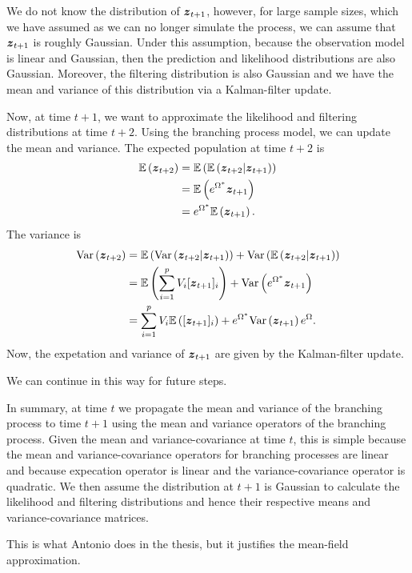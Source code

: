 \documentclass{article}
\begin{document}
We do not know the distribution of \(\boldsymbol{z}_{t+1}\), however, for large sample sizes, which we have assumed as we can no longer simulate the process, we can assume that \(\boldsymbol{z}_{t+1}\) is roughly Gaussian. Under this assumption, because the observation model is linear and Gaussian, then the prediction and likelihood distributions are also Gaussian. Moreover, the filtering distribution is also Gaussian and we have the mean and variance of this distribution via a Kalman-filter update.

Now, at time \(t+1\), we want to approximate the likelihood and filtering distributions at time \(t+2\). Using the branching process model, we can update the mean and variance. The expected population at time \(t+2\) is 
\begin{align}
    \mathbb{E}\left(\boldsymbol{z}_{t+2}\right) &= \mathbb{E}\left(\mathbb{E}\left(\boldsymbol{z}_{t+2}|\boldsymbol{z}_{t+1}\right)\right)
    \\&=\mathbb{E}\left(e^{\Omega^{*}}\boldsymbol{z}_{t+1}\right)
    \\&=e^{\Omega^{*}}\mathbb{E}\left(\boldsymbol{z}_{t+1}\right).
\end{align}
The variance is 
\begin{align}
    \mathrm{Var}\left(\boldsymbol{z}_{t+2}\right) &= \mathbb{E}\left(\mathrm{Var}\left(\boldsymbol{z}_{t+2}|\boldsymbol{z}_{t+1}\right)\right) + \mathrm{Var}\left(\mathbb{E}\left(\boldsymbol{z}_{t+2}|\boldsymbol{z}_{t+1}\right)\right)
    \\&=\mathbb{E}\left(\sum_{i=1}^pV_i[\boldsymbol{z}_{t+1}]_i\right) + \mathrm{Var}\left(e^{\Omega^{*}}\boldsymbol{z}_{t+1}\right)
    \\&=\sum_{i=1}^pV_i\mathbb{E}\left([\boldsymbol{z}_{t+1}]_i\right) + e^{\Omega^{*}}\mathrm{Var}\left(\boldsymbol{z}_{t+1}\right)e^{\Omega}.
\end{align}
Now, the expetation and variance of \(\boldsymbol{z}_{t+1}\) are given by the Kalman-filter update. 

We can continue in this way for future steps.

In summary, at time \(t\) we propagate the mean and variance of the branching process to time \(t+1\) using the mean and variance operators of the branching process. Given the mean and variance-covariance at time \(t\), this is simple because the mean and variance-covariance operators for branching processes are linear and because expecation operator is linear and the variance-covariance operator is quadratic. We then assume the distribution at \(t+1\) is Gaussian to calculate the likelihood and filtering distributions and hence their respective means and variance-covariance matrices.

This is what Antonio does in the thesis, but it justifies the mean-field approximation.
\end{document}
